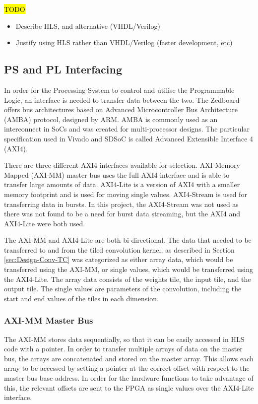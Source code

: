 \documentclass[12pt]{article}
\begin{document}
\hl{TODO}

\begin{itemize}
\item Describe HLS, and alternative (VHDL/Verilog)
\item Justify using HLS rather than VHDL/Verilog (faster development, etc)
\end{itemize}

\subsection{PS and PL Interfacing}
\label{sec:Design-PSnPL}

In order for the Processing System to control and utilise the Programmable Logic, an interface is needed to transfer data between the two. The Zedboard offers bus architectures based on Advanced Microcontroller Bus Architecture (AMBA) protocol, designed by ARM. AMBA is commonly used as an interconnect in SoCs and was created for multi-processor designs. The particular specification used in Vivado and SDSoC is called Advanced Extensible Interface 4 (AXI4). 

There are three different AXI4 interfaces available for selection. AXI-Memory Mapped (AXI-MM) master bus uses the full AXI4 interface and is able to transfer large amounts of data. AXI4-Lite is a version of AXI4 with a smaller memory footprint and is used for moving single values. AXI4-Stream is used for transferring data in bursts. In this project, the AXI4-Stream was not used as there was not found to be a need for burst data streaming, but the AXI4 and AXI4-Lite were both used. 

The AXI-MM and AXI4-Lite are both bi-directional. The data that needed to be transferred to and from the tiled convolution kernel, as described in Section \ref{sec:Design-Conv-TC} was categorized as either array data, which would be transferred using the AXI-MM, or single values, which would be transferred using the AXI4-Lite. The array data consists of the weights tile, the input tile, and the output tile. The single values are parameters of the convolution, including the start and end values of the tiles in each dimension.

\subsubsection{AXI-MM Master Bus}
\label{sec:Design-PSnPL-AXIMM}

The AXI-MM stores data sequentially, so that it can be easily accessed in HLS code with a pointer. In order to transfer multiple arrays of data on the master bus, the arrays are concatenated and stored on the master array. This allows each array to be accessed by setting a pointer at the correct offset with respect to the master bus base address. In order for the hardware functions to take advantage of this, the relevant offsets are sent to the FPGA as single values over the AXI4-Lite interface. 
\end{document}
